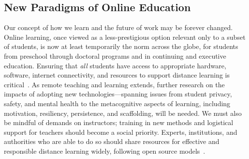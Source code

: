 \subsection*{New Paradigms of Online Education}
Our concept of how we learn and the future of work may be forever changed. Online learning, once viewed as a less-prestigious option relevant only to a subset of students, is now at least temporarily the norm across the globe, for students from preschool through doctoral programs and in continuing and executive education. Ensuring that \emph{all} students have access to appropriate hardware, software, internet connectivity, and resources to support distance learning is critical~\cite{UCBinterview, Jenna, Pardos}. 
As remote teaching and learning extends, further research on the impacts of adopting new technologies—spanning issues from student privacy, safety, and mental health to the metacognitive aspects of learning, including motivation, resiliency, persistence, and scaffolding, will be needed. We must also be mindful of demands on instructors; training in new methods and logistical support for teachers should become a social priority. Experts, institutions, and authorities who are able to do so should share resources for effective and responsible distance learning widely, following open source models~\cite{unesco}.



